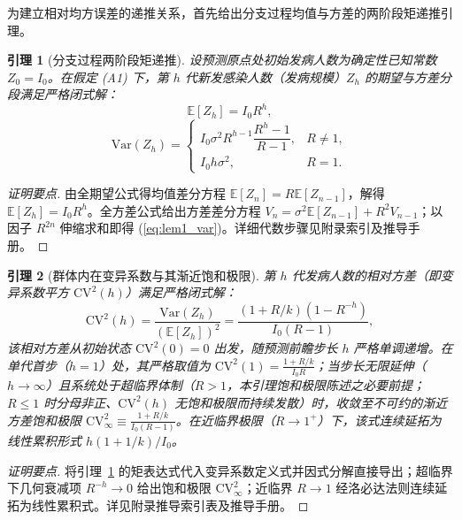 \documentclass[11pt,a4paper]{article}
\theoremstyle{plain}
\newtheorem{lemma}{引理}
\theoremstyle{definition}
\begin{document}
为建立相对均方误差的递推关系，首先给出分支过程均值与方差的两阶段矩递推引理。

\begin{lemma}[分支过程两阶段矩递推]\label{lem:branch_moments}
设预测原点处初始发病人数为确定性已知常数 $Z_0 = I_0$。在假定 (A1) 下，第 $h$ 代新发感染人数（发病规模）$Z_h$ 的期望与方差分段满足严格闭式解：
\begin{equation}
\mathbb{E}[Z_h] = I_0 R^h,
\end{equation}
\begin{equation}
\text{Var}(Z_h) = \begin{cases}
I_0 \sigma^2 R^{h-1} \dfrac{R^h - 1}{R - 1}, & R \neq 1, \\[8pt]
I_0 h \sigma^2, & R = 1.
\end{cases}
\label{eq:lem1_var}
\end{equation}
\end{lemma}

\begin{proof}[证明要点]
由全期望公式得均值差分方程 $\mathbb{E}[Z_n] = R\mathbb{E}[Z_{n-1}]$，解得 $\mathbb{E}[Z_h]=I_0 R^h$。全方差公式给出方差差分方程 $V_n = \sigma^2 \mathbb{E}[Z_{n-1}] + R^2 V_{n-1}$；以因子 $R^{2n}$ 伸缩求和即得 (\ref{eq:lem1_var})。详细代数步骤见附录索引及推导手册。
\end{proof}

\begin{lemma}[群体内在变异系数与其渐近饱和极限]\label{lem:cv_floor}
第 $h$ 代发病人数的相对方差（即变异系数平方 $\text{CV}^2(h)$）满足严格闭式解：
\begin{equation}
\text{CV}^2(h) = \frac{\text{Var}(Z_h)}{(\mathbb{E}[Z_h])^2} = \frac{(1 + R/k)(1 - R^{-h})}{I_0(R - 1)},
\label{eq:cv_floor}
\end{equation}
该相对方差从初始状态 $\text{CV}^2(0)=0$ 出发，随预测前瞻步长 $h$ 严格单调递增。在单代首步（$h=1$）处，其严格取值为 $\text{CV}^2(1) = \frac{1+R/k}{I_0 R}$；当步长无限延伸（$h \to \infty$）且系统处于超临界体制（$R > 1$，本引理饱和极限陈述之必要前提；$R\le1$ 时分母非正、$\text{CV}^2(h)$ 无饱和极限而持续发散）时，收敛至不可约的渐近方差饱和极限 $\text{CV}^2_\infty \equiv \frac{1 + R/k}{I_0(R - 1)}$。在近临界极限（$R \to 1^+$）下，该式连续延拓为线性累积形式 $h(1+1/k)/I_0$。
\end{lemma}

\begin{proof}[证明要点]
将引理~\ref{lem:branch_moments} 的矩表达式代入变异系数定义式并因式分解直接导出；超临界下几何衰减项 $R^{-h}\to 0$ 给出饱和极限 $\text{CV}^2_\infty$；近临界 $R\to 1$ 经洛必达法则连续延拓为线性累积式。详见附录推导索引表及推导手册。
\end{proof}
\end{document}
